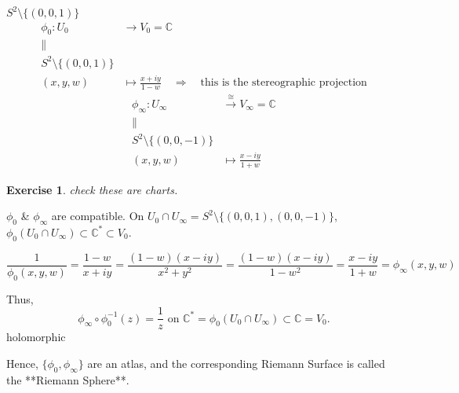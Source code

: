 \documentclass{article}
\newtheorem{exercise}{Exercise}
\begin{document}
$S^2 \setminus \{ (0,0,1) \}$
\begin{align*}
    \phi_0 : U_0 &\longrightarrow V_0 = \mathbb{C} \\
    \parallel \\
    S^2 \setminus \{ (0, 0, 1) \} \\
    (x, y, w) &\longmapsto \frac{x+iy}{1-w} \quad \Rightarrow \quad \text{this is the stereographic projection}
\end{align*}
\begin{align*}
    \phi_{\infty} : U_{\infty} &\xrightarrow{\cong} V_{\infty} = \mathbb{C} \\
    \parallel \\
    S^2 \setminus \{ (0, 0, -1) \} \\
    (x, y, w) &\longmapsto \frac{x-iy}{1+w}
\end{align*}

\begin{exercise}
check these are charts.
\end{exercise} 

$\phi_0$ \& $\phi_{\infty}$ are compatible. On $U_0 \cap U_{\infty} = S^2 \setminus \{ (0,0,1), (0,0,-1) \}$, $\phi_0(U_0 \cap U_{\infty}) \subset \mathbb{C}^* \subset V_0$.

$$
\frac{1}{\phi_0(x, y, w)} = \frac{1-w}{x+iy} = \frac{(1-w)(x-iy)}{x^2+y^2} = \frac{(1-w)(x-iy)}{1-w^2} = \frac{x-iy}{1+w} = \phi_{\infty}(x, y, w)
$$

Thus,
$$
\phi_{\infty} \circ \phi_0^{-1} (z) = \frac{1}{z} \text{ on } \mathbb{C}^* = \phi_0 (U_0 \cap U_{\infty}) \subset \mathbb{C} = V_0.
$$
holomorphic

Hence, $\{ \phi_0, \phi_{\infty} \}$ are an atlas, and the corresponding Riemann Surface is called the **Riemann Sphere**.
\end{document}

